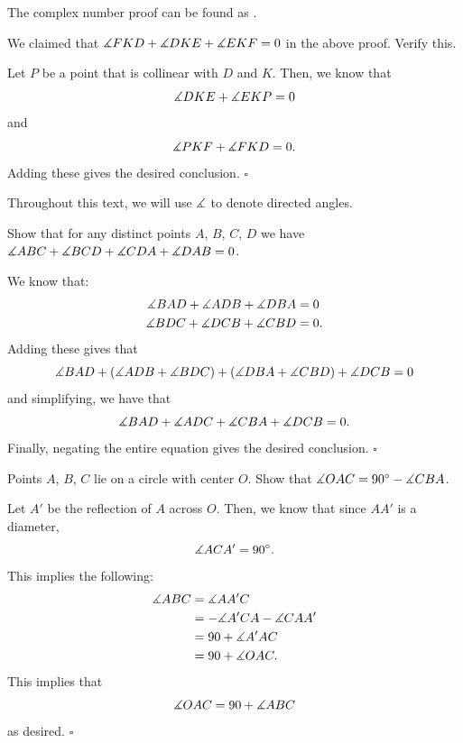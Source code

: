 \documentclass{article}
\begin{document}
\begin{remark*}
The complex number proof can be found as .
\end{remark*}

\begin{problem}[1.28]{}
We claimed that $\measuredangle FKD + \measuredangle DKE + \measuredangle EKF = 0$ in the above proof. Verify this.
\end{problem}
Let $P$ be a point that is collinear with $D$ and $K$. Then, we know that \[\measuredangle DKE + \measuredangle EKP = 0\] and \[\measuredangle PKF + \measuredangle FKD = 0.\] Adding these gives the desired conclusion. $\square$

\begin{remark*}
Throughout this text, we will use $\measuredangle$ to denote directed angles.
\end{remark*}

\begin{problem}[1.29]{}
Show that for any distinct points $A$, $B$, $C$, $D$ we have $\measuredangle ABC + \measuredangle BCD + \measuredangle CDA + \measuredangle DAB = 0$.
\end{problem}
We know that:
\begin{align*}
\measuredangle BAD + \measuredangle ADB + \measuredangle DBA &= 0 \\
\measuredangle BDC + \measuredangle DCB + \measuredangle CBD &= 0.
\end{align*}
Adding these gives that \[\measuredangle BAD + (\measuredangle ADB +\measuredangle BDC) + (\measuredangle DBA + \measuredangle CBD) + \measuredangle DCB  = 0\] and simplifying, we have that \[\measuredangle BAD + \measuredangle ADC + \measuredangle CBA + \measuredangle DCB = 0.\] Finally, negating the entire equation gives the desired conclusion. $\square$

\begin{problem}[1.30]{}
Points $A$, $B$, $C$ lie on a circle with center $O$. Show that $\measuredangle OAC = 90^\circ - \measuredangle CBA$.
\end{problem}
Let $A'$ be the reflection of $A$ across $O$. Then, we know that since $AA'$ is a diameter, \[\measuredangle ACA' = 90^\circ.\] This implies the following:
\begin{align*}
\measuredangle ABC &= \measuredangle AA'C \\
&= -\measuredangle A'CA - \measuredangle CAA' \\
&= 90 + \measuredangle A'AC \\
&= 90 + \measuredangle OAC.
\end{align*}
This implies that \[\measuredangle OAC = 90+\measuredangle ABC\] as desired. $\square$
\end{document}
